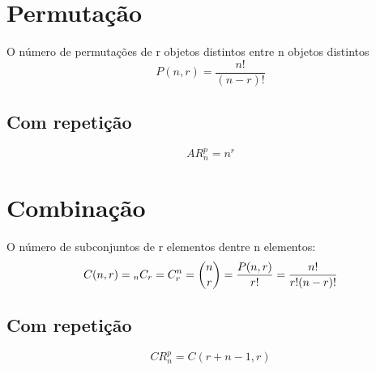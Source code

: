 \begin{tcolorbox}[sharp corners, colback=white,boxrule=1mm]
\section{Permutação}
O número de permutações de r objetos distintos entre n objetos distintos
\[P(n,r) = \frac{n!}{(n-r)!}\]

\subsection{Com repetição}
\[AR^p_n = n^r\]

\section{Combinação}
O número de subconjuntos de r elementos dentre n elementos:
\[C(n,r) = \verb||_nC_r = C^n_r = \binom{n}{r} = \frac{P(n,r)}{r!} = \frac{n!}{r!(n-r)!}\]

\subsection{Com repetição}
\[CR^p_n = C(r + n - 1, r)\]
\end{tcolorbox}